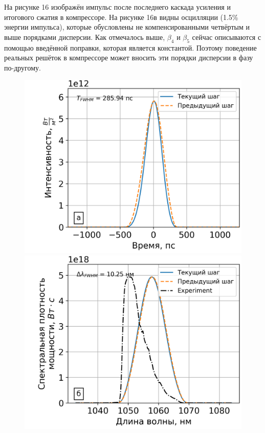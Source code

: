 \documentclass[12pt]{article}
\begin{document}
На рисунке 16 изображён импульс после последнего каскада усиления и итогового сжатия в компрессоре. На рисунке 16в
видны осцилляции (1.5\% энергии импульса), которые обусловлены не компенсированными четвёртым и выше порядками дисперсии. Как отмечалось выше,
$\beta_4$ и $\beta_5$ сейчас описываются с помощью введённой поправки, которая является константой. Поэтому поведение
реальных решёток в компрессоре может вносить эти порядки дисперсии в фазу по-другому.

\begin{figure}[h!]
  \centering
  \begin{minipage}[b]{0.5\textwidth}
    \includegraphics[width=\linewidth]{Images/Gauss Pulse Parabolic Profile/Импульс и спектр/!23. Fiber_pusle}
  \end{minipage}%
  \begin{minipage}[b]{0.5\textwidth}
    \includegraphics[width=\linewidth]{Images/Gauss Pulse Parabolic Profile/Импульс и спектр/!23. Fiber_spectrum}
  \end{minipage}


\end{figure}
\end{document}
